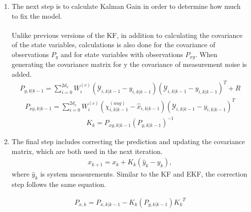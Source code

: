\begin{enumerate}
              
       \item The next step is to calculate Kalman Gain in order to determine how much to fix the model. \\ \\
       Unlike previous versions of the KF, in addition to calculating the covariance of the state variables, calculations is also done for the covariance of observations  $P_{y}$ and for state variables with observations $P_{xy}$. When generating the covariance matrix for y the covariance of measurement noise is added. 
        \begin{align*}
       P_{y, k | k-1} = \sum^{2d_x}_{i = 0} W_i^{(c)} (\mathcal{Y}_{i, k | k - 1} -   y_{i, k | k - 1} )(\mathcal{Y}_{i, k | k - 1} -  y_{i, k | k - 1} )^T + R
       \end{align*}
        \begin{align*}
       P_{xy, k | k-1} = \sum^{2d_x}_{i = 0} W_i^{(c)} (\chi^{(aug)}_{i, k | k - 1} -  \hat x_{i, k | k - 1} )(\mathcal{Y}_{i, k | k - 1} -  y_{i, k | k - 1} )^T 
       \end{align*}
       \begin{align*}
       K_k = P_{xy, k | k-1} (P_{y, k | k-1}) ^{-1}
       \end{align*}
        
        
        
      \item The final step includes correcting the prediction and updating the covariance matrix, which are both used in the next iteration.
      \begin{align*}
        x_{k+1} = x_{k} + K_k(\hat y_k - y_{k}),
        \end{align*}
        where $\hat{y}_k$ is system measurements.
        Similar to the KF and EKF, the correction step follows the same equation. 
      
       \begin{align*}
       P_{x, k} = P_{x, k|k-1} -K_k (P_{y, k | k-1} ) {K_k}^T     
       \end{align*}     
  
            
            

\end{enumerate}

